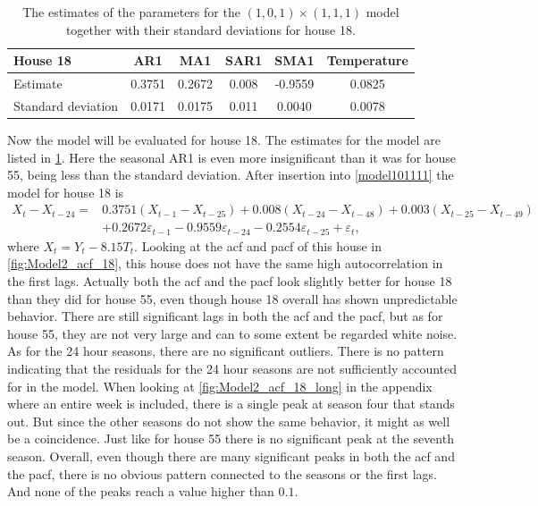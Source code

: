\begin{table}[ht]
    \centering
    \begin{tabular}{l|ccccc}
    \hline
    \textbf{House 18} & \textbf{AR1} & \textbf{MA1} & \textbf{SAR1} & \textbf{SMA1} & \textbf{Temperature} \\ \hline \hline
    Estimate           & 0.3751 & 0.2672 & 0.008 & -0.9559 & 0.0825      \\
    Standard deviation & 0.0171 & 0.0175 & 0.011 & 0.0040  & 0.0078      \\ \hline
    \end{tabular}
    \caption{The estimates of the parameters for the $(1,0,1)\times (1,1,1)$ model together with their standard deviations for house 18.}
    \label{tab:ParamSig_House18}
    \end{table}
\noindent Now the model will be evaluated for house 18. The estimates for the model are listed in \cref{tab:ParamSig_House18}. Here the seasonal AR1 is even more insignificant than it was for house 55, being less than the standard deviation. After insertion into \cref{model101111} the model for house 18 is
\begin{align}
    X_t-X_{t-24} = &0.3751 (X_{t-1}-X_{t-25}) + 0.008 (X_{t-24}-X_{t-48}) + 0.003 (X_{t-25}-X_{t-49}) \nonumber\\  &+ 0.2672 \varepsilon_{t-1} - 0.9559 \varepsilon_{t-24} - 0.2554 \varepsilon_{t-25} + \varepsilon_t, \label{pred_model}
\end{align}
where $X_t = Y_t - 8.15 T_t$. Looking at the acf and pacf of this house in \cref{fig:Model2_acf_18}, this house does not have the same high autocorrelation in the first lags. Actually both the acf and the pacf look slightly better for house 18 than they did for house 55, even though house 18 overall has shown unpredictable behavior. There are still significant lags in both the acf and the pacf, but as for house 55, they are not very large and can to some extent be regarded white noise. As for the 24 hour seasons, there are no significant outliers. There is no pattern indicating that the residuals for the 24 hour seasons are not sufficiently accounted for in the model. When looking at \cref{fig:Model2_acf_18_long} in the appendix where an entire week is included, there is a single peak at season four that stands out. But since the other seasons do not show the same behavior, it might as well be a coincidence. Just like for house 55 there is no significant peak at the seventh season. Overall, even though there are many significant peaks in both the acf and the pacf, there is no obvious pattern connected to the seasons or the first lags. And none of the peaks reach a value higher than $0.1$.
